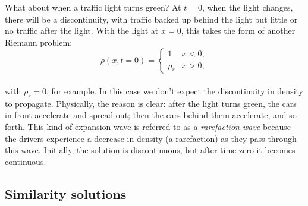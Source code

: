 \documentclass{SIAMbook2016}
\begin{document}
What about when a traffic light turns green? At \(t=0\), when the light
changes, there will be a discontinuity, with traffic backed up behind
the light but little or no traffic after the light. With the light at
\(x=0\), this takes the form of another Riemann problem:\\
\[
\rho(x,t=0) = \begin{cases} 1 & x<0, \\
                            \rho_r & x>0, \end{cases}
\]\\
with \(\rho_r = 0\), for example. In this case we don't expect the
discontinuity in density to propagate. Physically, the reason is clear:
after the light turns green, the cars in front accelerate and spread
out; then the cars behind them accelerate, and so forth. This kind of
expansion wave is referred to as a \emph{rarefaction wave} because the
drivers experience a decrease in density (a rarefaction) as they pass
through this wave. Initially, the solution is discontinuous, but after
time zero it becomes continuous.

\hypertarget{similarity-solutions}{%
\subsection{Similarity solutions}\label{similarity-solutions}}
\end{document}
